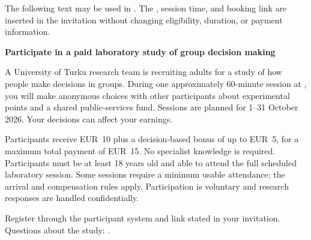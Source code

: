 


The following text may be used in . The , session time, and booking link are inserted in the invitation without changing eligibility, duration, or payment information.

\begin{infobox}[English]
\textbf{Participate in a paid laboratory study of group decision making}

A University of Turku research team is recruiting adults for a study of how people make decisions in groups. During one approximately 60-minute session at , you will make anonymous choices with other participants about experimental points and a shared public-services fund. Sessions are planned for 1--31 October 2026. Your decisions can affect your earnings.

Participants receive EUR~10 plus a decision-based bonus of up to EUR~5, for a maximum total payment of EUR~15. No specialist knowledge is required. Participants must be at least 18 years old and able to attend the full scheduled laboratory session. Some sessions require a minimum usable attendance; the  arrival and compensation rules apply. Participation is voluntary and research responses are handled confidentially.

Register through the participant system and link stated in your invitation. Questions about the study: \StudyEmail.
\end{infobox}

